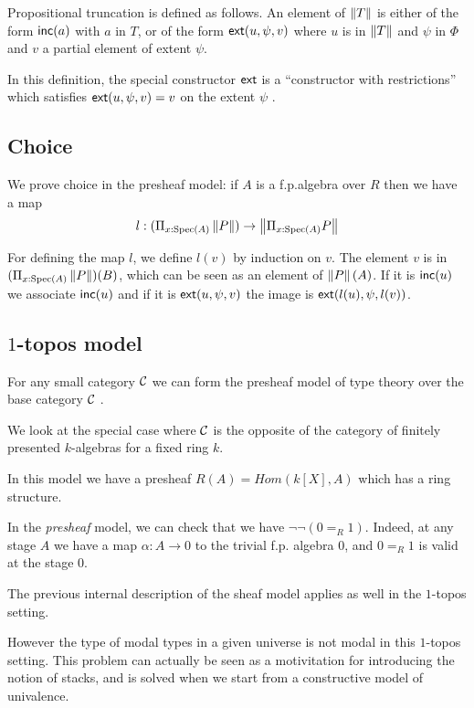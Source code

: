 \medskip    

Propositional truncation is defined as follows. An element of $\left\lVert T \right\rVert$ is either of the form
$\mathsf{inc}(a)$ with $a$ in $T$, or of the form $\mathsf{ext}(u,\psi,v)$ where $u$ is in $\left\lVert T \right\rVert$ and $\psi$
in $\Phi$ and $v$ a partial element of extent $\psi$.

In this definition, the special constructor $\mathsf{ext}$ is a ``constructor with restrictions'' which
satisfies $\mathsf{ext}(u,\psi,v) = v$ on the extent $\psi$ \cite{CoquandHM18}.

\subsection{Choice}

We prove choice in the presheaf model: if $A$ is a f.p.\@ algebra over $R$ then we have a map
$$
l:(\Pi_{x:\operatorname{Spec}(A)}\left\lVert P \right\rVert)\rightarrow \left\lVert \Pi_{x:\operatorname{Spec}(A)}P \right\rVert
$$

For defining the map $l$, we define $l(v)$ by induction on $v$.
The element $v$ is in $(\Pi_{x:\operatorname{Spec}(A)}\left\lVert P \right\rVert)(B)$, which can be seen as
an element of $\left\lVert P \right\rVert(A)$. If it is $\mathsf{inc}(u)$ we associate $\mathsf{inc}(u)$ and 
if it is $\mathsf{ext}(u,\psi,v)$ the image is $\mathsf{ext}(l(u),\psi,l(v))$.

\subsection{$1$-topos model}

For any small category $\mathcal{C}$ we can form the presheaf model of type theory over the base category $\mathcal{C}$ \cite{hofmann,huber-phd-thesis}.

\medskip

We look at the special case where $\mathcal{C}$ is the opposite of the category of finitely presented $k$-algebras for a fixed
ring $k$.

    In this model we have a presheaf $R(A) = Hom(k[X],A)$ which has a ring structure.

    In the {\em presheaf} model, we can check that we have $\neg\neg (0=_R 1)$. Indeed, at any stage $A$ we have
    a map $\alpha:A\rightarrow 0$ to the trivial f.p. algebra $0$, and $0 =_R 1$ is valid at the stage $0$.

    The previous internal description of the sheaf model applies as well in the $1$-topos setting.

    \medskip

    However the type of modal types in a given universe is not modal in this $1$-topos setting. This problem can actually be seen as a
    motivitation for introducing the notion of stacks, and is solved when we start from a constructive model of univalence.

